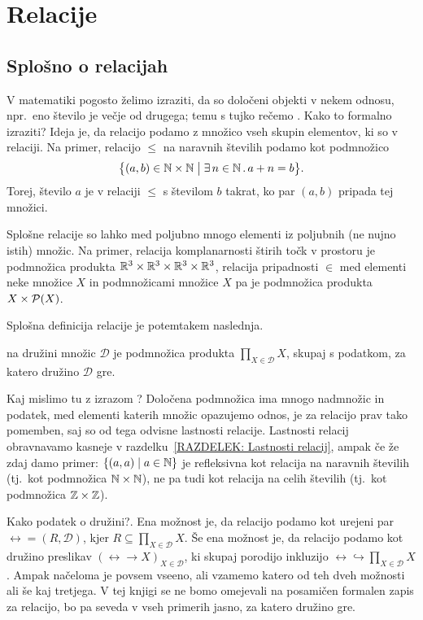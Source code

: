 \chapter{Relacije}\label{POGLAVJE: Relacije}

	\section{Splošno o relacijah}
	
		V matematiki pogosto želimo izraziti, da so določeni objekti v nekem odnosu, npr.~eno število je večje od drugega; temu s tujko rečemo . Kako to formalno izraziti? Ideja je, da relacijo podamo z množico vseh skupin elementov, ki so v relaciji. Na primer, relacijo $\leq$ na naravnih številih podamo kot podmnožico
		\[\set[1]{(a, b) \in \NN \times \NN}{\xsome{n}[\NN]{a + n = b}}.\]
		Torej, število $a$ je v relaciji $\leq$ s številom $b$ takrat, ko par $(a, b)$ pripada tej množici.
		
		Splošne relacije so lahko med poljubno mnogo elementi iz poljubnih (ne nujno istih) množic. Na primer, relacija komplanarnosti štirih točk v prostoru je podmnožica produkta $\mathbb{R}^3 \times \mathbb{R}^3 \times \mathbb{R}^3 \times \mathbb{R}^3$, relacija pripadnosti $\in$ med elementi neke množice $X$ in podmnožicami množice $X$ pa je podmnožica produkta $X \times \mathcal{P}(X)$.
		
		Splošna definicija relacije je potemtakem naslednja.
		\begin{definicija}
			 na družini množic $\mathscr{D}$ je podmnožica produkta $\prod_{X \in \mathscr{D}} X$, skupaj s podatkom, za katero družino $\mathscr{D}$ gre.
		\end{definicija}
		
		\begin{opomba}\label{OPOMBA: definicija relacij}
			Kaj mislimo tu z izrazom ? Določena podmnožica ima mnogo nadmnožic in podatek, med elementi katerih množic opazujemo odnos, je za relacijo prav tako pomemben, saj so od tega odvisne lastnosti relacije. Lastnosti relacij obravnavamo kasneje v razdelku~\ref{RAZDELEK: Lastnosti relacij}, ampak če že zdaj damo primer: $\set{(a, a)}{a \in \NN}$ je refleksivna kot relacija na naravnih številih (tj.~kot podmnožica $\mathbb{N} \times \mathbb{N}$), ne pa tudi kot relacija na celih številih (tj.~kot podmnožica $\mathbb{Z} \times \mathbb{Z}$).
			
			Kako  podatek o družini?. Ena možnost je, da relacijo podamo kot urejeni par $\rel = (R, \mathscr{D})$, kjer $R \subseteq \prod_{X \in \mathscr{D}} X$. Še ena možnost je, da relacijo podamo kot družino preslikav $(\rel \to X)_{X \in \mathscr{D}}$, ki skupaj porodijo inkluzijo $\rel \hookrightarrow \prod_{X \in \mathscr{D}} X$. Ampak načeloma je povsem vseeno, ali vzamemo katero od teh dveh možnosti ali še kaj tretjega. V tej knjigi se ne bomo omejevali na posamičen formalen zapis za relacijo, bo pa seveda v vseh primerih jasno, za katero družino gre.
		\end{opomba}
		
